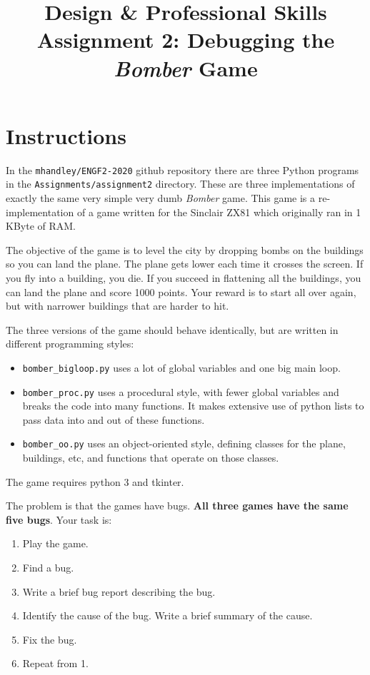 \documentclass{article}
\title{Design \& Professional Skills\\
  Assignment 2: Debugging the {\em Bomber} Game}
\author{}
\date{}
\begin{document}
\maketitle

\section*{Instructions}

In the {\tt mhandley/ENGF2-2020} github repository there are three
Python programs in the {\tt Assignments/assignment2} directory.  These
are three implementations of exactly the same very simple very dumb
{\em Bomber} game. This game is a re-implementation of a game written for
the Sinclair ZX81 which originally ran in 1 KByte of RAM.

The objective of the game is to level the city by dropping bombs on
the buildings so you can land the plane.  The plane gets lower each
time it crosses the screen.  If you fly into a building, you die.  If
you succeed in flattening all the buildings, you can land the plane
and score 1000 points.  Your reward is to start all over again, but
with narrower buildings that are harder to hit.  

The three versions of the game should behave identically, but are written in different programming styles:
\begin{itemize}
\item {\tt bomber\_bigloop.py} uses a lot of global variables and one big main loop.
\item{\tt bomber\_proc.py} uses a procedural style, with fewer global variables and breaks the code into many functions.  It makes extensive use of python lists to pass data into and out of these functions.
\item{\tt bomber\_oo.py} uses an object-oriented style, defining classes for the plane, buildings, etc, and functions that operate on those classes.
\end{itemize}
The game requires python 3 and tkinter.

The problem is that the games have bugs.  \textbf{All three games have the same five bugs}.  Your task is:
\begin{enumerate}
\item Play the game.
\item Find a bug.
\item Write a brief bug report describing the bug.
\item Identify the cause of the bug.  Write a brief summary of the cause.
\item Fix the bug.
\item Repeat from 1.
\end{enumerate}
\end{document}
